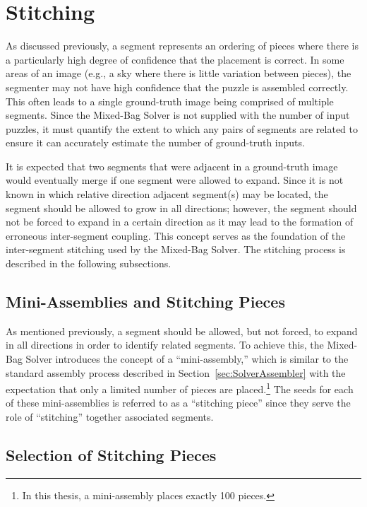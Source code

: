 \section{Stitching}\label{sec:stitching}

As discussed previously, a segment represents an ordering of pieces where there is a particularly high degree of confidence that the placement is correct.  In some areas of an image (e.g., a sky where there is little variation between pieces), the segmenter may not have high confidence that the puzzle is assembled correctly.  This often leads to a single ground-truth image being comprised of multiple segments. Since the Mixed-Bag Solver is not supplied with the number of input puzzles, it must quantify the extent to which any pairs of segments are related to ensure it can accurately estimate the number of ground-truth inputs.  

It is expected that two segments that were adjacent in a ground-truth image would eventually merge if one segment were allowed to expand. Since it is not known in which relative direction adjacent segment(s) may be located, the segment should be allowed to grow in all directions; however, the segment should not be forced to expand in a certain direction as it may lead to the formation of erroneous inter-segment coupling.  This concept serves as the foundation of the inter-segment stitching used by the Mixed-Bag Solver.  The stitching process is described in the following subsections.

\subsection{Mini-Assemblies and Stitching Pieces}

As mentioned previously, a segment should be allowed, but not forced, to expand in all directions in order to identify related segments.  To achieve this, the Mixed-Bag Solver introduces the concept of a ``mini-assembly,'' which is similar to the standard assembly process described in Section~\ref{sec:SolverAssembler} with the expectation that only a limited number of pieces are placed.\footnote{In this thesis, a mini-assembly places exactly 100 pieces.}  The seeds for each of these mini-assemblies is referred to as a ``stitching piece'' since they serve the role of ``stitching'' together associated segments.

\subsection{Selection of Stitching Pieces}\label{sec:stitchingPieceSelection}

